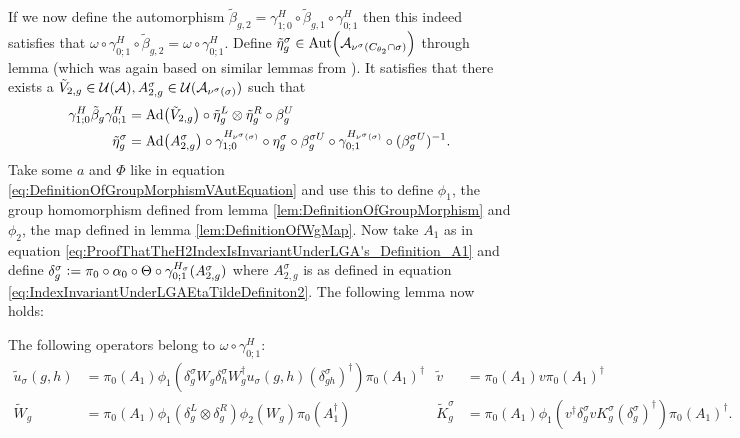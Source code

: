 \documentclass[11pt,a4paper,twoside]{article}
\def\version{1}
\newcommand{\versionDifference}[2]{\ifthenelse{\version=0}{#1}{#2}}
\numberwithin{equation}{section}
\begin{document}
	If we now define the automorphism $\tilde{\beta}_{g,2}=\gamma^{H}_{1;0}\circ\tilde\beta_{g,1}\circ\gamma^{H}_{0;1}$ then this indeed satisfies that $\omega\circ\gamma^{H}_{0;1}\circ\tilde{\beta}_{g,2}=\omega\circ\gamma^{H}_{0;1}$. Define $\tilde\eta_g^\sigma\in\Aut{\AA_{\nu^{\sigma}(C_{\theta_2}\cap\sigma)}}$ through lemma \versionDifference{\ref{lem:TwoAngleLemmaPart3}}{C.7. of \cite{jappens2023spt}} (which was again based on similar lemmas from \cite{ogata2021h3gmathbb}). It satisfies that there exists a $\tilde V_{2,g}\in\mathcal U(\mathcal A),A_{2,g}^{\sigma}\in\mathcal U(\mathcal A_{\nu^\sigma(\sigma)})$ such that
	\begin{align}
		\label{eq:IndexInvariantUnderLGAEtaTildeDefiniton1}
		\gamma^{H}_{1;0}\tilde{\beta}_g\gamma^{H}_{0;1}&=\Ad{\tilde V_{2,g}}\circ\tilde{\eta}_g^L\otimes\tilde{\eta}_g^R\circ\beta_g^U\\
		\label{eq:IndexInvariantUnderLGAEtaTildeDefiniton2}
		\tilde{\eta}_g^\sigma&=\Ad{A_{2,g}^\sigma}\circ\gamma^{H_{\nu^{\sigma}(\sigma)}}_{1;0}\circ\eta_g^\sigma\circ\beta_g^{\sigma U}\circ\gamma^{H_{\nu^{\sigma}(\sigma)}}_{0;1}\circ(\beta_g^{\sigma U})^{-1}.
	\end{align}
	Take some $a$ and $\Phi$ like in equation \eqref{eq:DefinitionOfGroupMorphismVAutEquation} and use this to define $\phi_1$, the group homomorphism defined from lemma \ref{lem:DefinitionOfGroupMorphism} and $\phi_2$, the map defined in lemma \ref{lem:DefinitionOfWgMap}. Now take $A_1$ as in equation \eqref{eq:ProofThatTheH2IndexIsInvariantUnderLGA's_Definition_A1} and define $\delta_g^\sigma\vcentcolon= \pi_0\circ\alpha_0\circ\Theta\circ\gamma^{H_\sigma}_{0;1}(A^\sigma_{2,g})$ where $A^\sigma_{2,g}$ is as defined in equation \eqref{eq:IndexInvariantUnderLGAEtaTildeDefiniton2}. The following lemma now holds:
	\begin{lemma}\label{lem:OperatorsBelongingToOmegaAfterH}
		The following operators belong to $\omega\circ\gamma^{H}_{0;1}:$
		\begin{align}
			\tilde u_\sigma(g,h)&=\pi_0(A_1) \phi_1\left(\delta^\sigma_g W_g\delta^\sigma_h W_g^\dagger u_\sigma(g,h)(\delta^\sigma_{gh})^\dagger\right)\pi_0(A_1)^\dagger&\tilde{v}&=\pi_0(A_1)v\pi_0(A_1)^\dagger\\
			\tilde{W}_g&=\pi_0(A_1)\phi_1(\delta^L_g\otimes\delta^R_g)\phi_2( W_g)\pi_0(A_1^\dagger)&\tilde{K}_g^\sigma&=\pi_0(A_1)\phi_1(v^\dagger \delta_g^\sigma v K_g^\sigma (\delta_g^\sigma)^\dagger) \pi_0(A_1)^\dagger.
		\end{align}
	\end{lemma}
\end{document}
